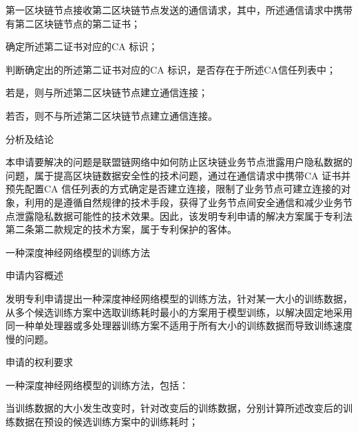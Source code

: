 {\setlength{\parindent}{20.6bp}第一区块链节点接收第二区块链节点发送的通信请求，其中，所述通信请求中携带有第二区块链节点的第二证书；\par}

{\setlength{\parindent}{20.6bp}确定所述第二证书对应的CA 标识；\par}

{\setlength{\parindent}{20.6bp}判断确定出的所述第二证书对应的CA 标识，是否存在于所述CA信任列表中；\par}

{\setlength{\parindent}{20.6bp}若是，则与所述第二区块链节点建立通信连接；\par}

{\setlength{\parindent}{20.6bp}若否，则不与所述第二区块链节点建立通信连接。\par}

{\setlength{\parindent}{20.1bp}分析及结论\par}

{\setlength{\parindent}{20.6bp}本申请要解决的问题是联盟链网络中如何防止区块链业务节点泄露用户隐私数据的问题，属于提高区块链数据安全性的技术问题，通过在通信请求中携带CA 证书并预先配置CA 信任列表的方式确定是否建立连接，限制了业务节点可建立连接的对象，利用的是遵循自然规律的技术手段，获得了业务节点间安全通信和减少业务节点泄露隐私数据可能性的技术效果。因此，该发明专利申请的解决方案属于专利法第二条第二款规定的技术方案，属于专利保护的客体。\par}

{\setlength{\parindent}{15.3bp}\par}

{\setlength{\parindent}{20.6bp}一种深度神经网络模型的训练方法\par}

{\setlength{\parindent}{20.1bp}申请内容概述\par}

{\setlength{\parindent}{20.6bp}发明专利申请提出一种深度神经网络模型的训练方法，针对某一大小的训练数据，从多个候选训练方案中选取训练耗时最小的方案用于模型训练，以解决固定地采用同一种单处理器或多处理器训练方案不适用于所有大小的训练数据而导致训练速度慢的问题。\par}

{\setlength{\parindent}{20.1bp}申请的权利要求\par}

{\setlength{\parindent}{20.6bp}一种深度神经网络模型的训练方法，包括：\par}

{\setlength{\parindent}{20.6bp}当训练数据的大小发生改变时，针对改变后的训练数据，分别计算所述改变后的训练数据在预设的候选训练方案中的训练耗时；\par}

